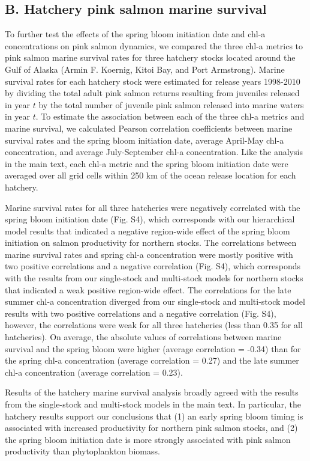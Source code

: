 \subsection{B. Hatchery pink salmon marine survival}

To further test the effects of the spring bloom initiation date and
chl-a concentrations on pink salmon dynamics, we compared the three
chl-a metrics to pink salmon marine survival rates for three hatchery
stocks located around the Gulf of Alaska (Armin F. Koernig, Kitoi Bay,
and Port Armstrong). Marine survival rates for each hatchery stock were
estimated for release years 1998-2010 by dividing the total adult pink
salmon returns resulting from juveniles released in year \(t\) by the
total number of juvenile pink salmon released into marine waters in year
\(t\). To estimate the association between each of the three chl-a
metrics and marine survival, we calculated Pearson correlation
coefficients between marine survival rates and the spring bloom
initiation date, average April-May chl-a concentration, and average
July-September chl-a concentration. Like the analysis in the main text,
each chl-a metric and the spring bloom initiation date were averaged
over all grid cells within 250 km of the ocean release location for each
hatchery.

Marine survival rates for all three hatcheries were negatively
correlated with the spring bloom initiation date (Fig. S4), which
corresponds with our hierarchical model results that indicated a
negative region-wide effect of the spring bloom initiation on salmon
productivity for northern stocks. The correlations between marine
survival rates and spring chl-a concentration were mostly positive with
two positive correlations and a negative correlation (Fig. S4), which
corresponds with the results from our single-stock and multi-stock
models for northern stocks that indicated a weak positive region-wide
effect. The correlations for the late summer chl-a concentration
diverged from our single-stock and multi-stock model results with two
positive correlations and a negative correlation (Fig. S4), however, the
correlations were weak for all three hatcheries (less than 0.35 for all
hatcheries). On average, the absolute values of correlations between
marine survival and the spring bloom were higher (average correlation =
-0.34) than for the spring chl-a concentration (average correlation =
0.27) and the late summer chl-a concentration (average correlation =
0.23).

Results of the hatchery marine survival analysis broadly agreed with the
results from the single-stock and multi-stock models in the main text.
In particular, the hatchery results support our conclusions that (1) an
early spring bloom timing is associated with increased productivity for
northern pink salmon stocks, and (2) the spring bloom initiation date is
more strongly associated with pink salmon productivity than
phytoplankton biomass.

